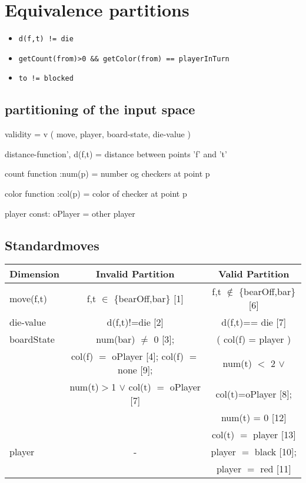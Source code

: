 \documentclass[a4paper]{article}
\begin{document}
\lhead{}
\rhead{}

\section{Equivalence partitions}

\begin{itemize}
\item
\begin{verbatim}
d(f,t) != die
\end{verbatim}


\item
\begin{verbatim}
getCount(from)>0 && getColor(from) == playerInTurn
\end{verbatim}


\item
\begin{verbatim}
to != blocked
\end{verbatim}

\end{itemize}

\subsection{partitioning of the input space}
validity = v ( move, player, board-state, die-value ) 

distance-function', d(f,t) = distance between points 'f' and 't'

count function :num(p) = number og checkers at point p

color function :col(p) = color of checker at point p

player const: oPlayer = other player 

\subsection{Standardmoves}

\noindent
\begin{tabular}{l|c|c}
Dimension & Invalid Partition & Valid Partition \\
\toprule
move(f,t) & f,t $\in$ \{bearOff,bar\} [1] & f,t $\notin$ \{bearOff,bar\} [6] \\
\midrule
die-value & d(f,t)!=die [2] & d(f,t)== die [7] \\
\midrule
boardState & num(bar) $\neq$ 0 [3];    & ( col(f) = player ) \\
           & col(f) $=$ oPlayer [4]; col(f) $=$ none [9];
              & num(t) $<$ 2 $\vee$ \\
           & num(t)$>$1 $\vee$ col(t) $=$ oPlayer [7] & col(t)=oPlayer
           [8]; \\
           & & num(t) = 0 [12]\\
       &   & col(t) $=$ player [13] \\
\midrule
player & - & player $=$ black [10]; \\
       &   & player $=$ red [11] \\

\bottomrule
\end{tabular}
\end{document}
